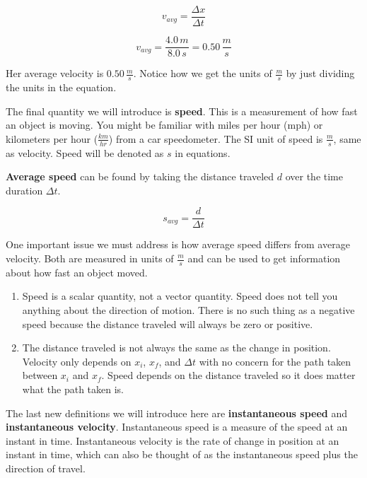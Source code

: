 \documentclass[12pt]{book}
\begin{document}
\begin{exampleblock}
\begin{equation}
v_{avg} = \frac{\Delta x}{\Delta t}
\end{equation}

\begin{equation}
v_{avg} = \frac{4.0 \, m}{8.0 \, s} = 0.50 \, \frac{m}{s}
\end{equation}

Her average velocity is $0.50 \, \frac{m}{s}$. Notice how we get the units of $\frac{m}{s}$ by just dividing the units in the equation.

\end{exampleblock}

The final quantity we will introduce is \textbf{speed}. This is a measurement of how fast an object is moving. You might be familiar with miles per hour (mph) or kilometers per hour ($\frac{km}{hr}$) from a car speedometer. The SI unit of speed is $\frac{m}{s}$, same as velocity. Speed will be denoted as $s$ in equations.

\textbf{Average speed} can be found by taking the distance traveled $d$ over the time duration $\Delta t$.

\begin{equation}
s_{avg} = \frac{d}{\Delta t}
\end{equation}

One important issue we must address is how average speed differs from average velocity. Both are measured in units of $\frac{m}{s}$ and can be used to get information about how fast an object moved.

\begin{enumerate}
\item Speed is a scalar quantity, not a vector quantity. Speed does not tell you anything about the direction of motion. There is no such thing as a negative speed because the distance traveled will always be zero or positive.

\item The distance traveled is not always the same as the change in position. Velocity only depends on $x_i$, $x_f$, and $\Delta t$ with no concern for the path taken between $x_i$ and $x_f$. Speed depends on the distance traveled so it does matter what the path taken is.
\end{enumerate}

The last new definitions we will introduce here are \textbf{instantaneous speed} and \textbf{instantaneous velocity}. Instantaneous speed is a measure of the speed at an instant in time. Instantaneous velocity is the rate of change in position at an instant in time, which can also be thought of as the instantaneous speed plus the direction of travel.
\end{document}
